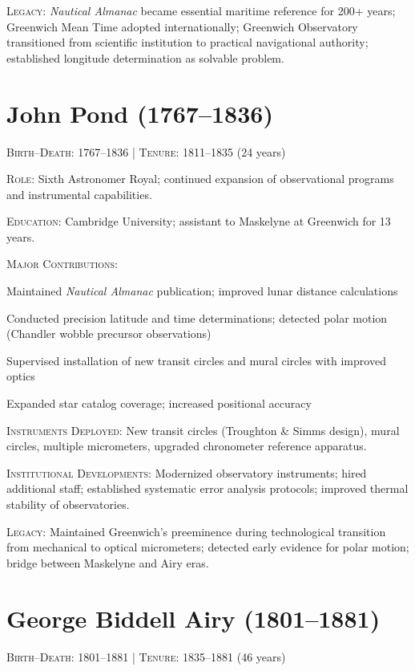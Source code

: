 \noindent\textsc{Legacy}: \emph{Nautical Almanac} became essential maritime reference for 200+ years; Greenwich Mean Time adopted internationally; Greenwich Observatory transitioned from scientific institution to practical navigational authority; established longitude determination as solvable problem.

\medskip

\section*{John Pond (1767--1836)}
\textsc{Birth--Death}: 1767--1836 | \textsc{Tenure}: 1811--1835 (24 years)

\noindent\textsc{Role}: Sixth Astronomer Royal; continued expansion of observational programs and instrumental capabilities.

\noindent\textsc{Education}: Cambridge University; assistant to Maskelyne at Greenwich for 13 years.

\noindent\textsc{Major Contributions}:
\begin{enumerate*}[label=(\arabic*)]
\item Maintained \emph{Nautical Almanac} publication; improved lunar distance calculations
\item Conducted precision latitude and time determinations; detected polar motion (Chandler wobble precursor observations)
\item Supervised installation of new transit circles and mural circles with improved optics
\item Expanded star catalog coverage; increased positional accuracy
\end{enumerate*}

\noindent\textsc{Instruments Deployed}: New transit circles (Troughton \& Simms design), mural circles, multiple micrometers, upgraded chronometer reference apparatus.

\noindent\textsc{Institutional Developments}: Modernized observatory instruments; hired additional staff; established systematic error analysis protocols; improved thermal stability of observatories.

\noindent\textsc{Legacy}: Maintained Greenwich's preeminence during technological transition from mechanical to optical micrometers; detected early evidence for polar motion; bridge between Maskelyne and Airy eras.

\medskip

\section*{George Biddell Airy (1801--1881)}
\textsc{Birth--Death}: 1801--1881 | \textsc{Tenure}: 1835--1881 (46 years)

